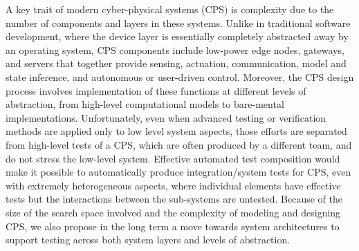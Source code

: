 A key trait of modern cyber-physical systems (CPS) is complexity due to the number of components and layers in these systems.  Unlike in traditional software development, where the device layer is essentially completely abstracted away by an operating system, CPS components include low-power edge nodes, gateways, and servers that together provide sensing, actuation, communication, model and state inference, and autonomous or user-driven control.  Moreover, the CPS design process involves implementation of these functions at different levels of abstraction, from high-level computational models to bare-mental implementations. Unfortunately, even when advanced testing or verification methods are applied only to low level system aspects, those efforts are separated from high-level tests of a CPS, which are often produced by a different team, and do not stress the low-level system.  Effective automated test composition would make it possible to automatically produce integration/system tests for CPS, even with extremely heterogeneous aspects, where individual elements have effective tests but the interactions between the sub-systems are untested.  Because of the size of the search space involved and the complexity of modeling and designing CPS, we also propose in the long term a move towards system architectures to support testing across both system layers and levels of abstraction.
